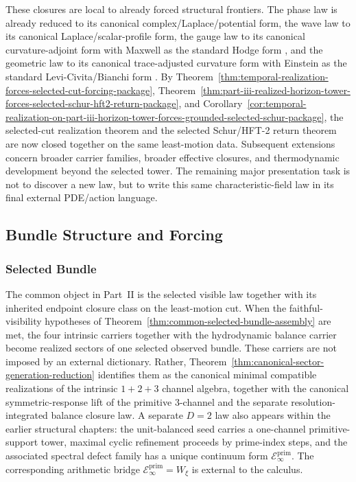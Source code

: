 These closures are local to already forced structural frontiers. The phase
law is already reduced to its canonical complex/Laplace/potential form, the
wave law to its canonical Laplace/scalar-profile form, the gauge
law to its canonical curvature-adjoint form with Maxwell as the standard
Hodge form \cite{Jackson1999}, and the geometric law to its canonical
trace-adjusted curvature form with Einstein as the standard
Levi-Civita/Bianchi form \cite{Wald1984}. By
Theorem~\ref{thm:temporal-realization-forces-selected-cut-forcing-package},
Theorem~\ref{thm:part-iii-realized-horizon-tower-forces-selected-schur-hft2-return-package},
and
Corollary~\ref{cor:temporal-realization-on-part-iii-horizon-tower-forces-grounded-selected-schur-package},
the selected-cut realization theorem and the selected Schur/HFT-2 return theorem
are now closed together on the same least-motion data. Subsequent extensions
concern broader carrier families, broader effective closures, and
thermodynamic development beyond the selected tower. The remaining major
presentation task is not to discover a new law, but to write this same
characteristic-field law in its final external PDE/action language.

\subsection{Bundle Structure and Forcing}

\subsubsection{Selected Bundle}

The common object in Part~II is the selected visible law together with its
inherited endpoint closure class on the least-motion cut. When the
faithful-visibility hypotheses of
Theorem~\ref{thm:common-selected-bundle-assembly} are met, the four intrinsic
carriers together with the hydrodynamic balance carrier become
realized sectors of one selected observed bundle. These carriers are not
imposed by an external dictionary. Rather,
Theorem~\ref{thm:canonical-sector-generation-reduction} identifies them as the
canonical minimal compatible realizations of the intrinsic \(1+2+3\) channel
algebra, together with the canonical symmetric-response lift of the primitive
\(3\)-channel and the separate resolution-integrated balance closure law. A
separate \(D=2\) law also appears within the earlier structural chapters: the unit-balanced seed
carries a one-channel primitive-support tower, maximal cyclic refinement
proceeds by prime-index steps, and the associated spectral defect family has a
unique continuum form \(\mathcal E_{\infty}^{\mathrm{prim}}\). The
corresponding arithmetic bridge \(\mathcal E_{\infty}^{\mathrm{prim}}
= W_{\xi}\) is external to the calculus.

